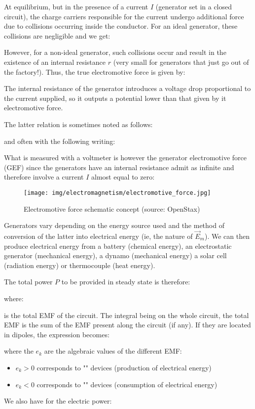 	At equilibrium, but in the presence of a current $I$ (generator set in a closed circuit), the charge carriers responsible for the current undergo additional force due to collisions occurring inside the conductor. For an ideal generator, these collisions are negligible and we get:
	
	However, for a non-ideal generator, such collisions occur and result in the existence of an internal resistance $r$ (very small for generators that just go out of the factory!). Thus, the true electromotive force is given by:
	
	The internal resistance of the generator introduces a voltage drop proportional to the current supplied, so it outputs a potential lower than that given by it electromotive force.
	
	The latter relation is sometimes noted as follows:
	
	and often with the following writing:
	
	What is measured with a voltmeter is however the generator electromotive force (GEF) since the generators have an internal resistance admit as infinite and therefore involve a current $I$ almost equal to zero:
	\begin{figure}[H]
		\centering
		\texttt{[image: img/electromagnetism/electromotive\_force.jpg]}	
		\caption[Electromotive force schematic concept]{Electromotive force schematic concept (source: OpenStax)}
	\end{figure}

	Generators vary depending on the energy source used and the method of conversion of the latter into electrical energy (ie, the nature of $\vec{E}_m$). We can then produce electrical energy from a battery (chemical energy), an electrostatic generator (mechanical energy), a dynamo (mechanical energy) a solar cell (radiation energy) or thermocouple (heat energy).
	
	The total power $P$ to be provided in steady state is therefore:
	
	where:
	
	is the total EMF of the circuit\label{total emf of the circuit}. The integral being on the whole circuit, the total EMF is the sum of the EMF present along the circuit (if any). If they are located in dipoles, the expression becomes:
	
	where the $e_k$ are the algebraic values of the different EMF:
	\begin{itemize}
		\item $e_k>0$ corresponds to "" devices (production of electrical energy)

		\item $e_k<0$ corresponds to "" devices (consumption of electrical energy)
	\end{itemize}
	We also have for the electric power:
	
